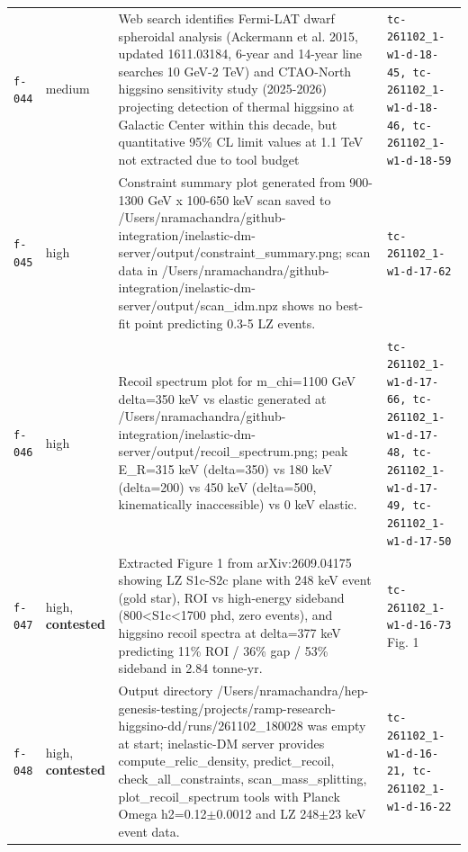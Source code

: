 \documentclass[11pt,a4paper]{article}
\begin{document}
\begin{longtable}{@{}p{}p{}p{}p{}@{}}
\texttt{f-044} & medium & Web search identifies Fermi-LAT dwarf spheroidal analysis (Ackermann et al. 2015, updated 1611.03184, 6-year and 14-year line searches 10 GeV-2 TeV) and CTAO-North higgsino sensitivity study (2025-2026) projecting detection of thermal higgsino at Galactic Center within this decade, but quantitative 95\% CL limit values at 1.1 TeV not extracted due to tool budget & \texttt{tc-261102\_\allowbreak{}1-w1-d-18-45,\allowbreak{} tc-261102\_\allowbreak{}1-w1-d-18-46,\allowbreak{} tc-261102\_\allowbreak{}1-w1-d-18-59} \\
\texttt{f-045} & high & Constraint summary plot generated from 900-1300 GeV x 100-650 keV scan saved to /Users/nramachandra/github-integration/inelastic-dm-server/output/constraint\_summary.png; scan data in /Users/nramachandra/github-integration/inelastic-dm-server/output/scan\_idm.npz shows no best-fit point predicting 0.3-5 LZ events. & \texttt{tc-261102\_\allowbreak{}1-w1-d-17-62} \\
\texttt{f-046} & high & Recoil spectrum plot for m\_chi=1100 GeV delta=350 keV vs elastic generated at /Users/nramachandra/github-integration/inelastic-dm-server/output/recoil\_spectrum.png; peak E\_R=315 keV (delta=350) vs 180 keV (delta=200) vs 450 keV (delta=500, kinematically inaccessible) vs 0 keV elastic. & \texttt{tc-261102\_\allowbreak{}1-w1-d-17-66,\allowbreak{} tc-261102\_\allowbreak{}1-w1-d-17-48,\allowbreak{} tc-261102\_\allowbreak{}1-w1-d-17-49,\allowbreak{} tc-261102\_\allowbreak{}1-w1-d-17-50} \\
\texttt{f-047} & high, \textbf{contested} & Extracted Figure 1 from arXiv:2609.04175 showing LZ S1c-S2c plane with 248 keV event (gold star), ROI vs high-energy sideband (800\textless{}S1c\textless{}1700 phd, zero events), and higgsino recoil spectra at delta=377 keV predicting 11\% ROI / 36\% gap / 53\% sideband in 2.84 tonne-yr. & \texttt{tc-261102\_\allowbreak{}1-w1-d-16-73} Fig. 1 \\
\texttt{f-048} & high, \textbf{contested} & Output directory /Users/nramachandra/hep-genesis-testing/projects/ramp-research-higgsino-dd/runs/261102\_180028 was empty at start; inelastic-DM server provides compute\_relic\_density, predict\_recoil, check\_all\_constraints, scan\_mass\_splitting, plot\_recoil\_spectrum tools with Planck Omega h2=0.12$\pm$0.0012 and LZ 248$\pm$23 keV event data. & \texttt{tc-261102\_\allowbreak{}1-w1-d-16-21,\allowbreak{} tc-261102\_\allowbreak{}1-w1-d-16-22} \\

\end{longtable}
\end{document}
